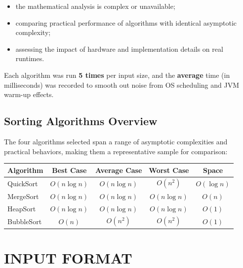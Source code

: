 \documentclass[12pt]{article}
\begin{document}
\begin{itemize}
  \item the mathematical analysis is complex or unavailable;
  \item comparing practical performance of algorithms with identical asymptotic complexity;
  \item assessing the impact of hardware and implementation details on real runtimes.
\end{itemize}

Each algorithm was run \textbf{5 times} per input size, and the \textbf{average} time (in milliseconds) was
recorded to smooth out noise from OS scheduling and JVM warm-up effects.

\subsection*{Sorting Algorithms Overview}

\hspace{0.8cm} The four algorithms selected span a range of asymptotic complexities and practical
behaviors, making them a representative sample for comparison:

\begin{center}
\renewcommand{\arraystretch}{1.4}
\begin{tabular}{lcccc}
\toprule
\textbf{Algorithm} & \textbf{Best Case} & \textbf{Average Case} & \textbf{Worst Case} & \textbf{Space} \\
\midrule
QuickSort   & $O(n \log n)$ & $O(n \log n)$ & $O(n^2)$      & $O(\log n)$ \\
MergeSort   & $O(n \log n)$ & $O(n \log n)$ & $O(n \log n)$ & $O(n)$      \\
HeapSort    & $O(n \log n)$ & $O(n \log n)$ & $O(n \log n)$ & $O(1)$      \\
BubbleSort  & $O(n)$        & $O(n^2)$      & $O(n^2)$      & $O(1)$      \\
\bottomrule
\end{tabular}
\end{center}

\section*{INPUT FORMAT}
\end{document}
